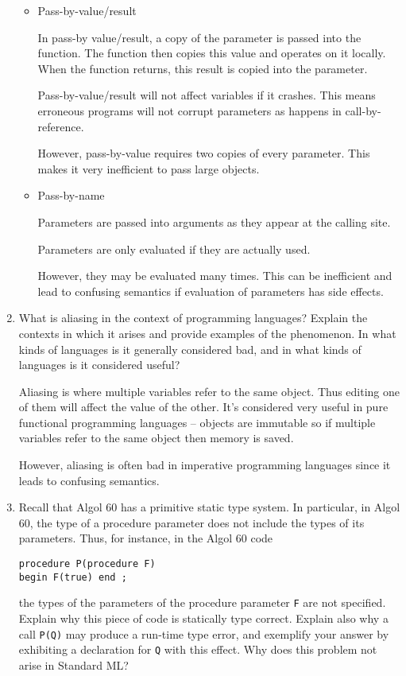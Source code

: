 \documentclass[10pt,\jkfside,a4paper]{article}
\begin{document}
\begin{enumerate}
\begin{itemize}
\item Pass-by-value/result

In pass-by value/result, a copy of the parameter is passed into the function.
The function then copies this value and operates on it locally. When the
function returns, this result is copied into the parameter.

Pass-by-value/result will not affect variables if it crashes. This means
erroneous programs will not corrupt parameters as happens in
call-by-reference.

However, pass-by-value requires two copies of every parameter. This makes it
very inefficient to pass large objects.

\item Pass-by-name

Parameters are passed into arguments as they appear at the calling site.

Parameters are only evaluated if they are actually used.

However, they may be evaluated many times. This can be inefficient and lead
to confusing semantics if evaluation of parameters has side effects.

\end{itemize}

\item What is aliasing in the context of programming languages? Explain the
contexts in which it arises and provide examples of the phenomenon. In what
kinds of languages is it generally considered bad, and in what kinds of
languages is it considered useful?

Aliasing is where multiple variables refer to the same object. Thus editing
one of them will affect the value of the other. It's considered very useful
in pure functional programming languages -- objects are immutable so if
multiple variables refer to the same object then memory is saved.

However, aliasing is often bad in imperative programming languages since
it leads to confusing semantics.

\item Recall that Algol 60 has a primitive static type system. In 
particular, in Algol 60, the type of a procedure parameter does not include
the types of its parameters. Thus, for instance, in the Algol 60 code
\begin{lstlisting}[language=Algol]
procedure P(procedure F)
begin F(true) end ;
\end{lstlisting}
the types of the parameters of the procedure parameter \texttt{F} are not
specified. Explain why this piece of code is statically type correct.
Explain also why a call \texttt{P(Q)} may produce a run-time type error,
and exemplify your answer by exhibiting a declaration for \texttt{Q} with
this effect. Why does this problem not arise in Standard ML?


\end{enumerate}
\end{document}

